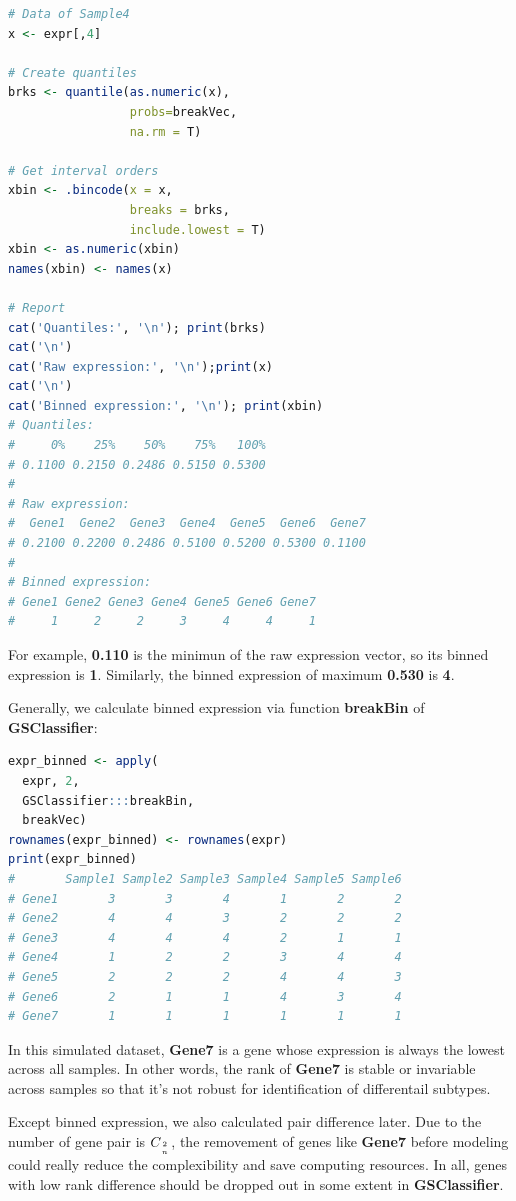 \documentclass[
  12pt,
]{book}
\begin{document}
\begin{lstlisting}[language=R]
# Data of Sample4
x <- expr[,4]

# Create quantiles  
brks <- quantile(as.numeric(x), 
                 probs=breakVec, 
                 na.rm = T)

# Get interval orders
xbin <- .bincode(x = x, 
                 breaks = brks, 
                 include.lowest = T)
xbin <- as.numeric(xbin)
names(xbin) <- names(x)

# Report
cat('Quantiles:', '\n'); print(brks)
cat('\n')
cat('Raw expression:', '\n');print(x)
cat('\n')
cat('Binned expression:', '\n'); print(xbin)
# Quantiles: 
#     0%    25%    50%    75%   100% 
# 0.1100 0.2150 0.2486 0.5150 0.5300 
# 
# Raw expression: 
#  Gene1  Gene2  Gene3  Gene4  Gene5  Gene6  Gene7 
# 0.2100 0.2200 0.2486 0.5100 0.5200 0.5300 0.1100 
# 
# Binned expression: 
# Gene1 Gene2 Gene3 Gene4 Gene5 Gene6 Gene7 
#     1     2     2     3     4     4     1
\end{lstlisting}

For example, \textbf{0.110} is the minimun of the raw expression vector, so its binned expression is \textbf{1}. Similarly, the binned expression of maximum \textbf{0.530} is \textbf{4}.

Generally, we calculate binned expression via function \textbf{breakBin} of \textbf{GSClassifier}:

\begin{lstlisting}[language=R]
expr_binned <- apply(
  expr, 2, 
  GSClassifier:::breakBin,
  breakVec)
rownames(expr_binned) <- rownames(expr)
print(expr_binned)
#       Sample1 Sample2 Sample3 Sample4 Sample5 Sample6
# Gene1       3       3       4       1       2       2
# Gene2       4       4       3       2       2       2
# Gene3       4       4       4       2       1       1
# Gene4       1       2       2       3       4       4
# Gene5       2       2       2       4       4       3
# Gene6       2       1       1       4       3       4
# Gene7       1       1       1       1       1       1
\end{lstlisting}

In this simulated dataset, \textbf{Gene7} is a gene whose expression is always the lowest across all samples. In other words, the rank of \textbf{Gene7} is stable or invariable across samples so that it's not robust for identification of differentail subtypes.

Except binned expression, we also calculated pair difference later. Due to the number of gene pair is \(C_{2 \atop n}\), the removement of genes like \textbf{Gene7} before modeling could really reduce the complexibility and save computing resources. In all, genes with low rank difference should be dropped out in some extent in \textbf{GSClassifier}.
\end{document}
